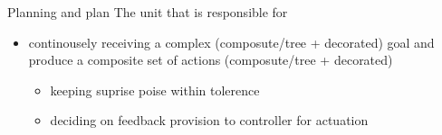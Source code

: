 \begin{frame}[allowframebreaks]{Planning and plan}
    The unit that is responsible for
    \begin{itemize}
        \item continousely receiving a complex (composute/tree + decorated) goal and produce a composite set of actions (composute/tree + decorated)
        \begin{itemize}
            \item keeping suprise poise within tolerence
            \item deciding on feedback provision to controller for actuation
        \end{itemize}
    \end{itemize}
\end{frame}